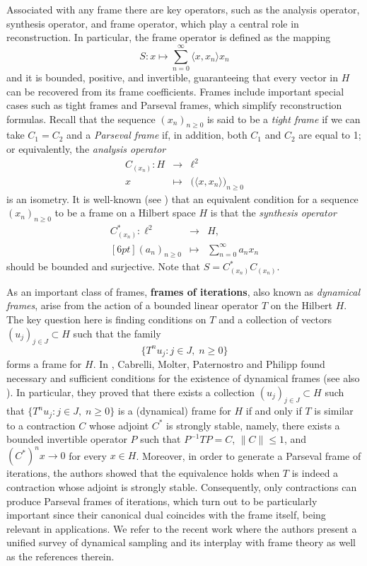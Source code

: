 \documentclass[11pt]{amsart}
\theoremstyle{definition}
\theoremstyle{remark}
\numberwithin{equation}{section}
\begin{document}
Associated with any frame there are key operators, such as the analysis operator, synthesis operator, and frame operator, which play a central role in reconstruction. In particular, the frame operator is
defined as the mapping
\[
S:x \mapsto \sum_{n=0}^\infty \langle x,x_n \rangle x_n
\]
and it is
bounded, positive, and invertible, guaranteeing that every vector in $H$ can be recovered from its frame coefficients. Frames include important special cases such as tight frames and Parseval frames, which simplify reconstruction formulas. Recall that the sequence $(x_n)_{n \ge 0}$  is said to be a {\em tight frame\/} if we can take $C_1=C_2$ and a {\em Parseval frame\/} if, in addition, both $C_1$ and $C_2$ are equal to 1; or equivalently,
the \emph{analysis operator}
\[
\begin{array}{ccl}
C_{(x_n)}: H & \longrightarrow & \ell^2 \\[4pt]
x & \longmapsto & \big(\langle x, x_n \rangle\big)_{n\geq 0}
\end{array}
\]
is an isometry. It is well-known (see \cite[Chap.~4]{meyer}) that an equivalent condition for a sequence
$(x_n)_{n \ge 0}$ to be a frame on a Hilbert space $H$  is that the \emph{synthesis operator}
\begin{eqnarray}\label{eq:bddsurj}
C_{(x_n)}^*: \ell^2 & \longrightarrow  & H, \nonumber  \\ [6pt]
(a_n)_{n\geq 0} & \longmapsto & \sum_{n=0}^\infty a_n x_n
\end{eqnarray}
should be bounded and surjective. Note that $S=C_{(x_n)}^*C_{(x_n)}$.

\smallskip

As an important class of frames, \textbf{frames of iterations}, also known as \emph{dynamical frames}, arise from the action of a bounded linear operator $T$ on the Hilbert $H$. The key question here is finding conditions on $T$ and a collection of vectors $(u_j)_{j\in J}\subset H$ such that the family
\[
\{T^n u_j : j \in J,\; n\ge 0\}
\]
forms a frame for $H$. In \cite{CMPP20}, Cabrelli, Molter, Paternostro and Philipp found necessary and sufficient conditions for the existence
of dynamical frames (see also \cite{ACNP25}). In particular, they proved that there exists a collection $(u_j)_{j\in J}\subset H$ such that
$\{T^n u_j : j \in J,\; n \ge 0\}$ is a (dynamical) frame for $H$ if and only if $T$ is similar to a contraction $C$ whose adjoint $C^*$ is strongly stable, namely, there exists a bounded invertible operator $P$ such that
$P^{-1}TP = C$, $\|C\|\le 1$, and $(C^*)^n x \to 0$ for every $x\in H$.
Moreover, in order to generate a Parseval frame of iterations, the authors showed that the equivalence holds when $T$ is indeed a contraction whose adjoint is strongly stable.
Consequently, only contractions can produce Parseval frames of iterations, which turn out to be particularly important since their canonical dual coincides with the frame itself, being relevant in applications. We refer to the recent work \cite{ACKM25} where the authors present a unified survey of dynamical sampling and
its interplay with frame theory as well as the references therein.
\end{document}
